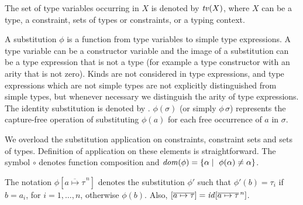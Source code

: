 The set of type variables occurring in $X$ is denoted by ${\it tv\/}(X)$,
where $X$ can be a type, a constraint, sets of types or constraints,
or a typing context.

A substitution $\phi$ is a function from type variables to simple type
expressions. A type variable can be a constructor variable and the
image of a substitution can be a type expression that is not a type
(for example a type constructor with an arity that is not zero). Kinds
are not considered in type expressions, and type expressions which are
not simple types are not explicitly distinguished from simple types,
but whenever necessary we distinguish the arity of type expressions.
The identity substitution is denoted by \id. $\phi(\sigma)$ (or simply
$\phi\,\sigma$) represents the capture-free operation of substituting
$\phi(a)$ for each free occurrence of $a$ in $\sigma$.

We overload the substitution application on constraints, constraint
sets and sets of types. Definition of application on these elements is
straightforward. The symbol $\circ$ denotes function composition and
$\mathit{dom}(\phi)=\{\alpha \mid\ \phi(\alpha) \neq \alpha\}$.

The notation $\phi[\overline{a\mapsto\tau}^{\,n}]$ denotes the
substitution $\phi'$ such that $\phi'(b) = \tau_i$ if $b = a_i$, for
$i = 1,\ldots,n$, otherwise $\phi(b)$. Also,
$[\overline{a\mapsto\tau}] = {\it id\/}[\overline{a\mapsto\tau}^{\,n}]$.
